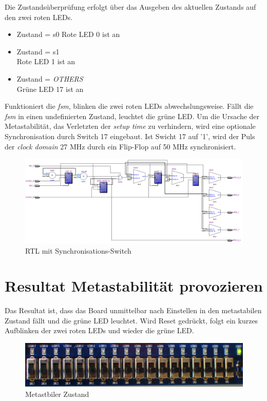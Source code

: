 Die Zustandsüberprüfung erfolgt über das Ausgeben des aktuellen Zustands auf den zwei roten LEDs. 
\begin{itemize}
	\item Zustand = s0
	\newline Rote LED 0 ist an
	\item Zustand = s1\\
	 Rote LED 1 ist an
	\item Zustand = \textit{OTHERS}\\
	 Grüne LED 17 ist an\\
\end{itemize}

Funktioniert die \textit{fsm}, blinken die zwei roten LEDs abwechslungsweise. Fällt die \textit{fsm} in einen undefinierten Zustand, leuchtet die grüne LED. Um die Ursache der Metastabilität, das Verletzten der \textit{setup time} zu verhindern, wird eine optionale Synchronisation durch Switch 17 eingebaut. Ist Swicht 17  auf '1', wird der Puls der \textit{clock domain} 27 MHz durch ein Flip-Flop auf 50 MHz synchronisiert.

\begin{figure}[H]
	\centering
	\includegraphics[width=1\textwidth]{images/metastability/RtL_metastaibility.png}
	\caption{RTL mit Synchronisations-Switch}
	\label{fig.metastabil.RtL}
\end{figure}


\newpage
\section{Resultat Metastabilität provozieren}\label{sect.meatastabil_proozieren}
Das Resultat ist, dass das Board unmittelbar nach Einstellen in den metastabilen Zustand fällt und die grüne LED leuchtet. Wird Reset gedrückt, folgt ein kurzes Aufblinken der zwei roten LEDs und wieder die grüne LED.\\
\begin{figure}[H]
	\centering
	\includegraphics[width=1\textwidth]{images/metastability/metastabil.JPG}
	\caption{Metastbiler Zustand}
	\label{fig.metastabil.Ergebnis_Boardasynchron}
\end{figure}


